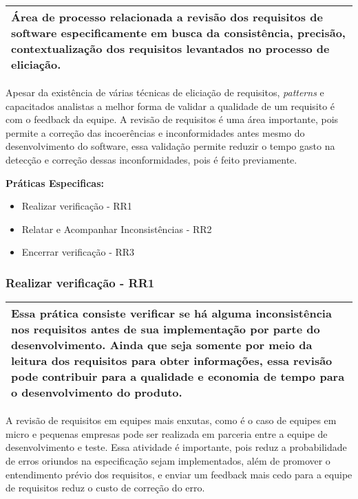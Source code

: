 \begin{table}[!ht]
\centering
\begin{tabular}{|p{130mm}|}
\hline
Área de processo relacionada a revisão dos requisitos de software especificamente em busca da consistência, precisão, contextualização dos requisitos levantados no processo de eliciação. \\ 
\hline
\end{tabular}
\end{table}

Apesar da existência de várias técnicas de eliciação de requisitos, \textit{patterns} e capacitados analistas a melhor forma de validar a qualidade de um requisito é com o feedback da equipe. A revisão de requisitos é uma área importante, pois permite a correção das incoerências e inconformidades antes mesmo do desenvolvimento do software, essa validação permite reduzir o tempo gasto na detecção e correção dessas inconformidades, pois é feito previamente.

\textbf{Práticas Especificas:}
\begin{itemize}
    \item Realizar verificação - RR1
    \item Relatar e Acompanhar Inconsistências - RR2
    \item Encerrar verificação - RR3
\end{itemize}

\subsubsection{Realizar verificação - RR1}
\label{sec:realverificacao}

\begin{table}[!ht]
\centering
\begin{tabular}{|p{130mm}|}
\hline
Essa prática consiste verificar se há alguma inconsistência nos requisitos antes de sua implementação por parte do desenvolvimento. Ainda que seja somente por meio da leitura dos requisitos para obter informações, essa revisão pode contribuir para a qualidade e economia de tempo para o desenvolvimento do produto. \\ 
\hline
\end{tabular}
\end{table}

A revisão de requisitos em equipes mais enxutas, como é o caso de equipes em micro e pequenas empresas pode ser realizada em parceria entre a equipe de desenvolvimento e teste. Essa atividade é importante, pois reduz a probabilidade de erros oriundos na especificação sejam implementados, além de promover o entendimento prévio dos requisitos, e enviar um feedback mais cedo para a equipe de requisitos reduz o custo de correção do erro.

